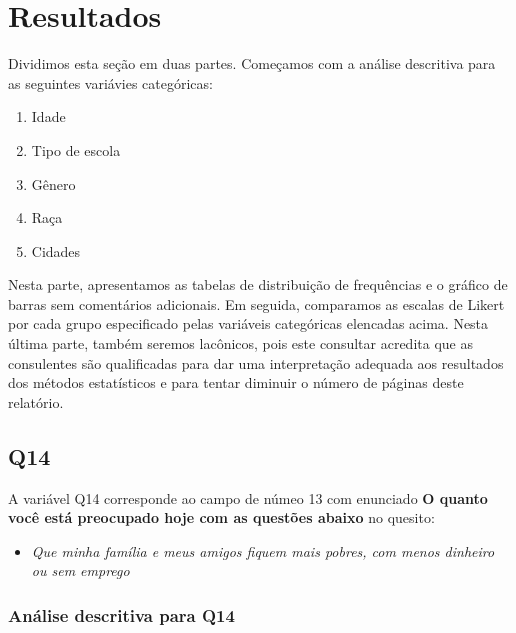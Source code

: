 \documentclass[]{article}
\providecommand{\tightlist}{%
  \setlength{\itemsep}{0pt}\setlength{\parskip}{0pt}}
\begin{document}
\cleardoublepage

\hypertarget{resultados}{%
\section{Resultados}\label{resultados}}

Dividimos esta seção em duas partes. Começamos com a análise descritiva para as seguintes variávies categóricas:

\begin{enumerate}
\def\labelenumi{\roman{enumi}.}
\tightlist
\item
  Idade
\item
  Tipo de escola
\item
  Gênero
\item
  Raça
\item
  Cidades
\end{enumerate}

Nesta parte, apresentamos as tabelas de distribuição de frequências e o gráfico de barras sem comentários adicionais. Em seguida, comparamos as escalas de Likert por cada grupo especificado pelas variáveis categóricas elencadas acima. Nesta última parte, também seremos lacônicos, pois este consultar acredita que as consulentes são qualificadas para dar uma interpretação adequada aos resultados dos métodos estatísticos e para tentar diminuir o número de páginas deste relatório.

\cleardoublepage

\hypertarget{q14}{%
\subsection{Q14}\label{q14}}

A variável Q14 corresponde ao campo de númeo 13 com enunciado \textbf{O quanto você está preocupado hoje com as questões abaixo} no quesito:

\begin{itemize}
\tightlist
\item
  \emph{Que minha família e meus amigos fiquem mais pobres, com menos dinheiro ou sem emprego}
\end{itemize}

\hypertarget{anuxe1lise-descritiva-para-q14}{%
\subsubsection{Análise descritiva para Q14}\label{anuxe1lise-descritiva-para-q14}}
\end{document}
